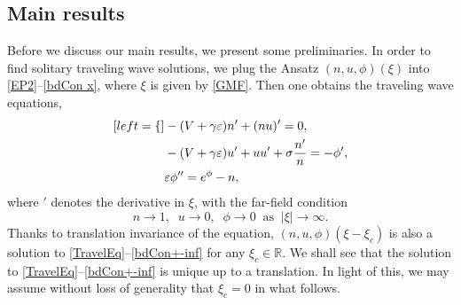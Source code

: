 \documentclass{amsart}
\newcommand{\veps}{\varepsilon}
\numberwithin{equation}{section}
\theoremstyle{plain}%
\theoremstyle{definition}
\theoremstyle{remark}
\theoremstyle{remark}
\begin{document}
\subsection{Main results}
Before we discuss our main results, we present some preliminaries. 
In order to find solitary traveling wave solutions, we plug the Ansatz $(n,u,\phi)(\xi)$ into \eqref{EP2}--\eqref{bdCon x}, where $\xi$ is given by \eqref{GMF}.
Then one obtains the traveling wave equations,
\begin{subequations}\label{TravelEq}
\begin{align}[left = \empheqlbrace\,]
& -(V+\gamma\veps) n' + (nu)'= 0, \label{TravelEq1} \\
& -(V+\gamma\veps)u' + uu' +\sigma \frac{n'}{n}= -\phi',\label{TravelEq2}\\
& \veps\phi'' = e^\phi-n,\label{TravelEq3}
\end{align}
\end{subequations}
where $'$ denotes the derivative in $\xi$, with the far-field condition
\begin{equation}\label{bdCon+-inf}
n \to 1, \;\; u \to 0, \;\; \phi \to 0 \;\; \text{as} \;\; | \xi | \to  \infty.
\end{equation}
Thanks to translation invariance of the equation, $(n,u,\phi)(\xi-\xi_c)$ is also a solution to \eqref{TravelEq}--\eqref{bdCon+-inf} for any $\xi_c\in\mathbb{R}$. %
We shall see that the solution to \eqref{TravelEq}--\eqref{bdCon+-inf} is unique up to a translation. In light of this, we may assume without loss of generality  that $\xi_c=0$ in what follows. 
\end{document}
